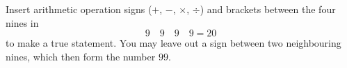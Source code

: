 Insert arithmetic operation signs ($+$, $-$, $\times$, $\div$) and brackets between the four nines in
\[
9\quad9\quad9\quad9=20
\]
to make a true statement. You may leave out a sign between two neighbouring nines, which then form the number $99$.
